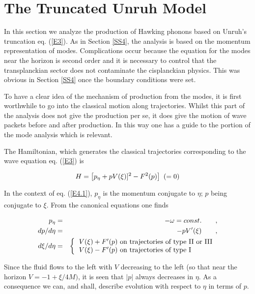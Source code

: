 \documentclass[12pt]{article}
\begin{document}
\section{The Truncated Unruh Model}\label{SS5}


In this section we analyze the production of Hawking phonons based on Unruh's
truncation  eq. (\ref{E3}). As in Section \ref{SS4}, the analysis is based on the
momentum representation of modes. Complications occur because the equation for
the modes near the horizon is second order and it is necessary to control that
the transplanckian sector does not contaminate the cisplanckian physics. This
was obvious in Section \ref{SS4} once the boundary conditions were set.

To have a clear idea of the mechanism of production from the modes, it is first
worthwhile to go into the classical motion along trajectories. Whilst this part
of the analysis does not give the production per se, it does give the
motion of wave packets before and after production. In this way one has
a guide to the portion of the mode analysis which is relevant.

The Hamiltonian, which generates the classical trajectories corresponding to
the wave equation  eq. (\ref{E3}) is

\begin{equation}
\label{E4.1}
H = \left [ p_\eta + p\/ V  (\xi) ] ^2 - F^2 (p) \right] \ (= 0)
\end{equation}



\noindent
In the context of  eq. (\ref{E4.1}), $p_\eta$ is the momentum conjugate to $
\eta$; $p$ being conjugate to $ \xi$. From the canonical equations  one finds

\begin{eqnarray}
p_\eta &=&-\omega=const.\qquad ,\\
d p / d \eta & =& - p V^{\prime}(\xi) \qquad , \label{E4.2}\\
d \xi / d \eta&=&\left \{ \begin{tabular}{ll}
$V(\xi)+F^\prime (p)$ on trajectories of type II or III\\
$V(\xi)-F^\prime (p)$ on trajectories of type I
\end{tabular}
\right.
\end{eqnarray}


\noindent Since the fluid flows to the left with $V$ decreasing to the left (so
that near the horizon $ V = - 1 + \xi / 4 M)$, it is seen that $ \vert p \vert$
always decreases in $\eta$. As a consequence we can, and shall, describe
evolution with respect to $ \eta$ in terms of $p$.
\end{document}
